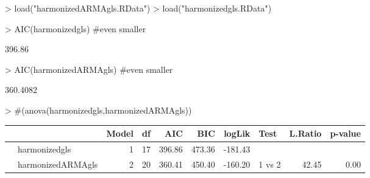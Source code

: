 \documentclass[10pt, a4paper]{article} %
\begin{document}
\begin{Schunk}
\begin{Sinput}
> load("harmonizedARMAgls.RData")
> load("harmonizedgls.RData")
\end{Sinput}
\end{Schunk}

\begin{Schunk}
\begin{Sinput}
> AIC(harmonizedgls) #even smaller 
\end{Sinput}
\begin{Soutput}
[1] 396.86
\end{Soutput}
\begin{Sinput}
> AIC(harmonizedARMAgls) #even smaller 
\end{Sinput}
\begin{Soutput}
[1] 360.4082
\end{Soutput}
\begin{Sinput}
> #(anova(harmonizedgls,harmonizedARMAgls))
\end{Sinput}
\end{Schunk}

\begin{table}[H]
\centering
\begin{tabular}{rlrrrrrlrr}
\hline
&  & Model & df & AIC & BIC & logLik & Test & L.Ratio & p-value \\
\hline
&harmonizedgls  & 1 & 17 & 396.86 & 473.36 & -181.43 & & & \\
&harmonizedARMAgls  & 2 & 20 & 360.41 & 450.40 & -160.20 & 1 vs 2 & 42.45 & 0.00 \\
\hline
\end{tabular}
\end{table}
\end{document}
